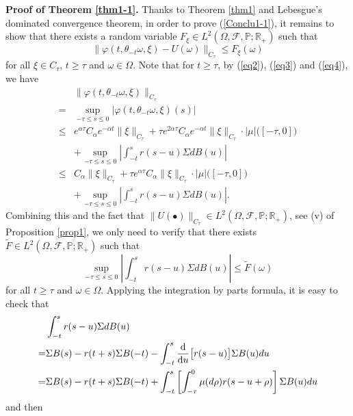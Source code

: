 \documentclass[preprint,12pt]{elsarticle}
\begin{document}
\noindent
{\bf Proof of Theorem \ref{thm1-1}.} Thanks to Theorem \ref{thm1} and Lebesgue's dominated convergence theorem, in order to prove (\ref{Conclu1-1}), it remains to show that there exists a random variable $F_\xi\in L^2(\Omega,\mathscr{F},\mathbb{P};\mathbb{R}_+)$ such that
\begin{equation}\label{eq20-1}
\|\varphi(t,\theta_{-t}\omega,\xi)-U(\omega)\|_{C_\tau}\leq F_\xi(\omega)
\end{equation}
for all $\xi\in C_\tau$, $t\geq\tau$ and $\omega\in\Omega$. Note that for $t\geq\tau$, by (\ref{eq2}), (\ref{eq3}) and (\ref{eq4}), we have
\begin{align}\label{eq20-2}
&\|\varphi(t,\theta_{-t}\omega,\xi)\|_{C_\tau}\nonumber\\
=&\sup_{-\tau\leq s\leq0}\left|\varphi(t,\theta_{-t}\omega,\xi)(s)\right|\nonumber\\
\leq&e^{\alpha\tau}C_\alpha e^{-\alpha t}\|\xi\|_{C_\tau}+\tau e^{2\alpha\tau}C_\alpha e^{-\alpha t}\|\xi\|_{C_\tau}\cdot|\mu|\bigl([-\tau,0]\bigr)\nonumber\\
&+\sup_{-\tau\leq s\leq0}\left|\int_{-t}^s r(s-u)\Sigma dB(u)\right|\nonumber\\
\leq&C_\alpha\|\xi\|_{C_\tau}+\tau e^{\alpha\tau}C_\alpha\|\xi\|_{C_\tau}\cdot|\mu|\bigl([-\tau,0]\bigr)\nonumber\\
&+\sup_{-\tau\leq s\leq0}\left|\int_{-t}^s r(s-u)\Sigma dB(u)\right|.
\end{align}
Combining this and the fact that $\|U(\bullet)\|_{C_\tau}\in L^2(\Omega,\mathscr{F},\mathbb{P};\mathbb{R}_+)$, see (v) of Proposition \ref{prop1}, we only need to verify that there exists $\widetilde{F}\in L^2(\Omega,\mathscr{F},\mathbb{P};\mathbb{R}_+)$ such that
\begin{equation}\label{eq20-3}
\sup_{-\tau\leq s\leq0}\left|\int_{-t}^s r(s-u)\Sigma dB(u)\right|\leq \widetilde{F}(\omega)
\end{equation}
for all $t\geq\tau$ and $\omega\in\Omega$. Applying the integration by parts formula, it is easy to check that
\begin{align}
&\int_{-t}^s r(s-u)\Sigma dB(u)\nonumber\\
=&\Sigma B(s)-r(t+s)\Sigma B(-t)-\int_{-t}^{s}\frac{\rm d}{{\rm d}u}\bigl[r(s-u)\bigr]\Sigma B(u)du\nonumber\\
=&\Sigma B(s)-r(t+s)\Sigma B(-t)+\int_{-t}^{s}\left[\int_{-\tau}^0\mu(d\rho)r(s-u+\rho)\right]\Sigma B(u)du\nonumber
\end{align}
and then
\end{document}
